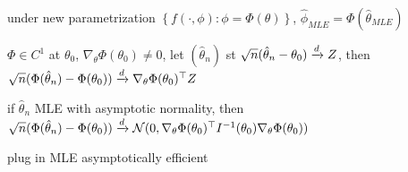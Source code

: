 \begin{fact}
    under new parametrization $\left\{ f(\cdot, \phi) : \phi = \Phi(\theta) \right\}$, $\hat \phi_{MLE} = \Phi (\hat \theta_{MLE})$
\end{fact}

\begin{thm}
    $\Phi \in C^1$ at $\theta_0$, $\nabla_\theta \Phi(\theta_0) \neq 0$, let $(\hat \theta_n)$ st $\sqrt{n}(\hat \theta_n - \theta_0) \xrightarrow{d} Z$, then\\
    $\sqrt{n} (\Phi(\hat \theta_n) - \Phi(\theta_0)) \xrightarrow{d} \nabla_\theta \Phi(\theta_0)^\top Z$
\end{thm}

\begin{fact}
    if $\hat \theta_n$ MLE with asymptotic normality, then $\sqrt{n}(\Phi(\hat \theta_n) - \Phi(\theta_0)) \xrightarrow{d} \mathcal{N}(0, \nabla_\theta \Phi(\theta_0)^\top I^{-1}(\theta_0) \nabla_\theta \Phi(\theta_0))$
\end{fact}

\begin{fact}
    plug in MLE asymptotically efficient
\end{fact}
